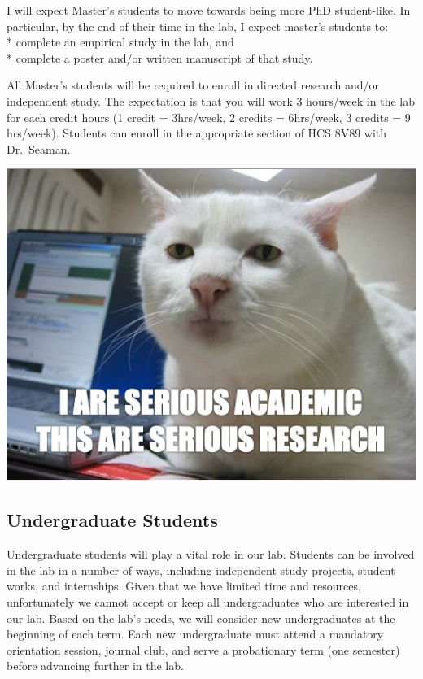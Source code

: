 \documentclass[
]{book}
\begin{document}
I will expect Master's students to move towards being more PhD student-like. In particular, by the end of their time in the lab, I expect master's students to:\\
* complete an empirical study in the lab, and\\
* complete a poster and/or written manuscript of that study.

All Master's students will be required to enroll in directed research and/or independent study. The expectation is that you will work 3 hours/week in the lab for each credit hours (1 credit = 3hrs/week, 2 credits = 6hrs/week, 3 credits = 9 hrs/week). Students can enroll in the appropriate section of HCS 8V89 with Dr.~Seaman.

\includegraphics{images/researchcat.jpg}

\hypertarget{undergraduate-students}{%
\subsection{Undergraduate Students}\label{undergraduate-students}}

Undergraduate students will play a vital role in our lab. Students can be involved in the lab in a number of ways, including independent study projects, student works, and internships. Given that we have limited time and resources, unfortunately we cannot accept or keep all undergraduates who are interested in our lab. Based on the lab's needs, we will consider new undergraduates at the beginning of each term. Each new undergraduate must attend a mandatory orientation session, journal club, and serve a probationary term (one semester) before advancing further in the lab.
\end{document}
